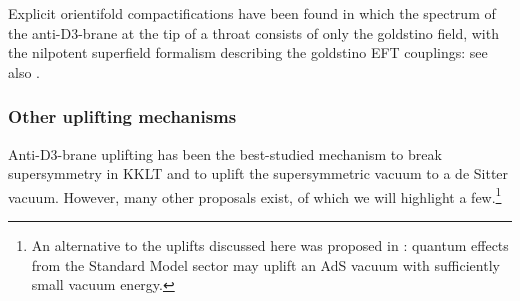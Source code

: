 \documentclass[12pt,a4wide]{article}
\begin{document}
Explicit orientifold compactifications have been found in which the spectrum of the anti-D3-brane at the tip of a throat consists of only the goldstino field, with the nilpotent superfield formalism describing the goldstino EFT couplings\cite{Kallosh:2015nia, Garcia-Etxebarria:2015lif,Aparicio:2015psl}: see also \cite{Antoniadis:2014oya,Dudas:2015eha,GarciadelMoral:2017vnz,Cribiori:2019hod}.

\subsubsection{Other uplifting mechanisms }\label{ss:otheruplift}
Anti-D3-brane uplifting has been the best-studied mechanism to break supersymmetry in KKLT and to uplift the supersymmetric vacuum to a de Sitter vacuum.
However, many other proposals exist, of which we will highlight a few.\footnote{An alternative to the uplifts discussed here was proposed in \cite{deAlwis:2021zab}: quantum effects from the Standard Model sector may uplift an AdS vacuum with sufficiently small vacuum energy.}
\end{document}
